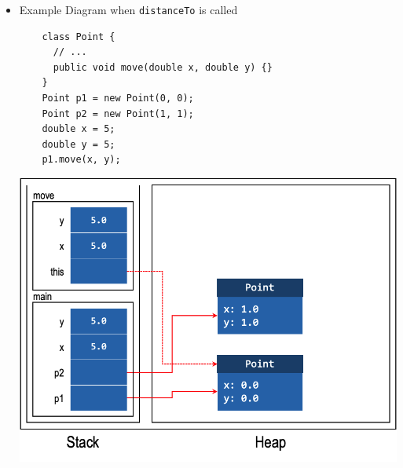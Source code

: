 \documentclass[10pt, landscape]{article}
\begin{document}
\begin{multicols*}{4}
\begin{itemize}
    \item Example Diagram when \lstinline{distanceTo} is called
    \begin{lstlisting}
    class Point {
      // ...
      public void move(double x, double y) {}
    }
    Point p1 = new Point(0, 0);
    Point p2 = new Point(1, 1);
    double x = 5;
    double y = 5;
    p1.move(x, y);
    \end{lstlisting}
    \includegraphics[width=\linewidth]{007c.png}
\end{itemize}


\end{multicols*}
\end{document}
